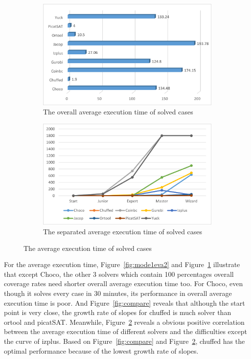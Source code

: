 \begin{figure}[htbp]
\centering
\begin{subfigure}{0.48\textwidth}
\includegraphics[width=\textwidth]{figs/mode1averagetime.png}
\caption{The overall average execution time of solved cases}
\label{fig:mode1averagetime1}
\end{subfigure}
\begin{subfigure}{0.48\textwidth}
\includegraphics[width=\textwidth]{figs/mode1seperatedtime.png}
\caption{The separated average execution time of solved cases}
\label{fig:mode1averagetime2}
\end{subfigure}
\caption{The average execution time of solved cases}
\label{fig:mode1averagetime}
\end{figure}
For the average execution time, Figure~\ref{fig:mode1eva2} and Figure~\ref{fig:mode1averagetime1} illustrate that except Choco, the other 3 solvers which contain 100 percentages overall coverage rates need shorter overall average execution time too. For Choco, even though it solves every case in 30 minutes, its performance in overall average execution time is poor. And Figure~\ref{fig:compare} reveals that although the start point is very close, the growth rate of slopes for chuffed is much solver than ortool and picatSAT. Meanwhile, Figure~\ref{fig:mode1averagetime2} reveals a obvious positive correlation between the average execution time of different solvers and the difficulties except the curve of izplus. Based on Figure~\ref{fig:compare} and Figure~\ref{fig:mode1averagetime2}, chuffed has the optimal performance because of the lowest growth rate of slopes. 
